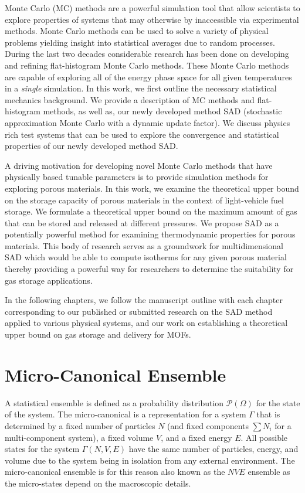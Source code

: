 Monte Carlo (MC) methods are a powerful simulation tool that allow scientists to
explore properties of systems that may otherwise by inaccessible via
experimental methods. Monte Carlo methods can be used to solve a variety of
physical problems yielding insight into statistical averages due to random
processes. During the last two decades considerable research has been done on
developing and refining flat-histogram Monte Carlo methods. These Monte Carlo
methods are capable of exploring all of the energy phase space for all
given temperatures in a \emph{single} simulation. In this work, we first
outline the necessary statistical mechanics background. We provide a
description of MC methods and flat-histogram methods, as well as, our newly
developed method SAD (stochastic approximation Monte Carlo with a dynamic
update factor). We discuss physics rich test systems that can be used to
explore the convergence and statistical properties of our newly developed
method SAD.

A driving motivation for developing novel Monte Carlo methods that have
physically based tunable parameters is to provide simulation methods for
exploring porous materials. In this work, we examine the theoretical upper
bound on the storage capacity of porous materials in the context of
light-vehicle fuel storage. We formulate a theoretical upper bound on the
maximum amount of gas that can be stored and released at different pressures.
We propose SAD as a potentially powerful method for examining thermodynamic
properties for porous materials. This body of research serves as a groundwork
for multidimensional SAD which would be able to compute isotherms for any given
porous material thereby providing a powerful way for researchers to determine
the suitability for gas storage applications.

In the following chapters, we follow the manuscript outline with each chapter
corresponding to our published or submitted research on the SAD method applied
to various physical systems, and our work on establishing a theoretical upper
bound on gas storage and delivery for MOFs.

\section{Micro-Canonical Ensemble}\label{micro}
A statistical ensemble is defined as a probability distribution
$\mathcal{P}\left(\Omega\right)$ for the state of the system. The
micro-canonical is a representation for a
system $\Gamma$ that is determined by a fixed number of particles $N$ (and fixed components $\sum N_i$ for a multi-component
system), a fixed volume $V$, and a fixed
energy $E$. All possible states for the system
$\Gamma\left(N,V,E\right)$ have the same number of particles, energy, and
volume due to the system being in isolation from any external environment. The
micro-canonical ensemble is for this reason
also known as the $NVE$ ensemble as the micro-states depend on the
 macroscopic details.

